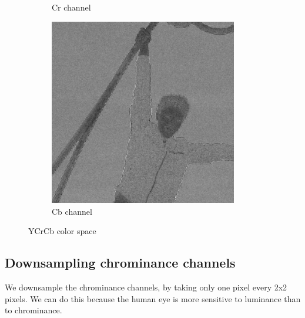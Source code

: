 \begin{figure}[H]
\begin{subfigure}[b]{0.3\textwidth}
        \caption{Cr channel}
        \label{fig:tests-Cr}
    \end{subfigure}
    \begin{subfigure}[b]{0.3\textwidth}
        \centering
        \includegraphics[width=0.9\textwidth]{src/assets/tests/Cb.png}
        \caption{Cb channel}
        \label{fig:tests-Cb}
    \end{subfigure}
    \caption{YCrCb color space}
    \label{fig:tests-yuv}
\end{figure}


\subsection{Downsampling chrominance channels}

We downsample the chrominance channels, by taking only one pixel every 2x2 pixels.
We can do this because the human eye is more sensitive to luminance than to chrominance.


